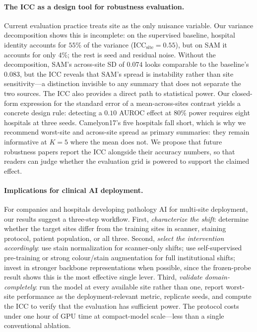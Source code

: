 \documentclass[10pt]{article} %
\begin{document}
\paragraph{The ICC as a design tool for robustness evaluation.}
Current evaluation practice treats site as the only nuisance variable. Our
variance decomposition shows this is incomplete: on the supervised baseline,
hospital identity accounts for $55\%$ of the variance
($\mathrm{ICC}_{\mathrm{site}}=0.55$), but on SAM it accounts for only $4\%$;
the rest is seed and residual noise. Without the decomposition, SAM's
across-site SD of $0.074$ looks comparable to the baseline's $0.083$, but the
ICC reveals that SAM's spread is instability rather than site sensitivity---a
distinction invisible to any summary that does not separate the two sources.
The ICC also provides a direct path to statistical power. Our closed-form
expression for the standard error of a mean-across-sites contrast yields a
concrete design rule: detecting a $0.10$ AUROC effect at $80\%$ power requires
eight hospitals at three seeds. Camelyon17's five hospitals fall short, which is
why we recommend worst-site and across-site spread as primary summaries: they
remain informative at $K=5$ where the mean does not. We propose that future
robustness papers report the ICC alongside their accuracy numbers, so that
readers can judge whether the evaluation grid is powered to support the claimed
effect.

\paragraph{Implications for clinical AI deployment.}
For companies and hospitals developing pathology AI for multi-site deployment,
our results suggest a three-step workflow. First, \emph{characterize the
shift}: determine whether the target sites differ from the training sites in
scanner, staining protocol, patient population, or all three. Second,
\emph{select the intervention accordingly}: use stain normalization for
scanner-only shifts; use self-supervised pre-training or strong
colour/stain augmentation for full institutional shifts; invest in stronger
backbone representations when possible, since the frozen-probe result shows
this is the most effective single lever. Third, \emph{validate
domain-completely}: run the model at every available site rather than one,
report worst-site performance as the deployment-relevant metric, replicate
seeds, and compute the ICC to verify that the evaluation has sufficient power.
The protocol costs under one hour of GPU time at compact-model scale---less
than a single conventional ablation.
\end{document}
